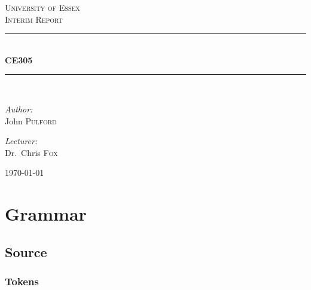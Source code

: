 \documentclass[a4paper,12pt]{article}
\begin{document}
\begin{titlepage}
    \newcommand{\HRule}{\rule{\linewidth}{0.5mm}}
    \begin{center}


        \textsc{\LARGE University of Essex}\\[1.5cm]

        \textsc{\Large Interim Report}\\[0.5cm]

        \HRule \\[0.4cm]
        { \huge \bfseries \gls{CE305} \\[0.4cm] }

        \HRule \\[1.5cm]

        \begin{minipage}{0.4\textwidth}
            \begin{flushleft} \large
                \emph{Author:}\\
                John \textsc{Pulford}
            \end{flushleft}
        \end{minipage}
        \begin{minipage}{0.4\textwidth}
            \begin{flushright} \large
                \emph{Lecturer:} \\
                Dr.~Chris \textsc{Fox}
            \end{flushright}
        \end{minipage}

        \vfill

        {\large \today}

    \end{center}
\end{titlepage}

\tableofcontents
\section{Grammar}
\subsection{Source}
\setlength{\grammarparsep}{20pt plus 1pt minus 1pt} %
\setlength{\grammarindent}{12em} %
\subsubsection{Tokens}
\end{document}
